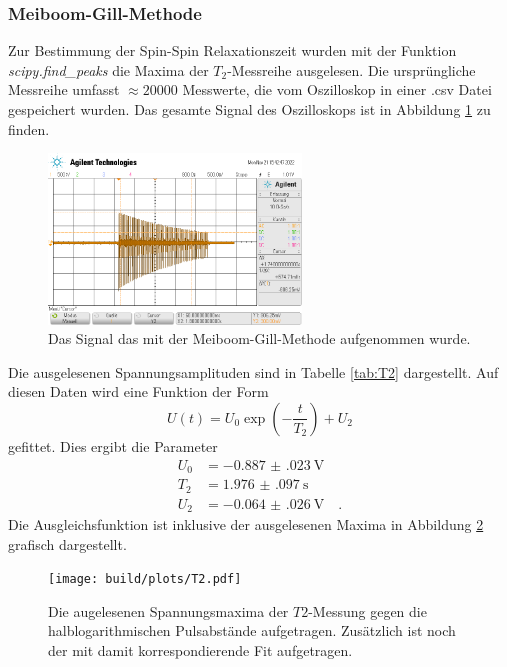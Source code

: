 \subsubsection{Meiboom-Gill-Methode}

\noindent
Zur Bestimmung der Spin-Spin Relaxationszeit wurden mit der Funktion \textit{scipy.find\_peaks} die Maxima der $T_2$-Messreihe ausgelesen. 
Die ursprüngliche Messreihe umfasst $\approx 20000$ Messwerte, die vom Oszilloskop in einer .csv Datei gespeichert wurden. 
Das gesamte Signal des Oszilloskops ist in Abbildung \ref{img:Sig1} zu finden.
\begin{figure}[H]
  \centering
  \includegraphics[width=0.6\textwidth]{python/data/scope_2.png}
  \caption{Das Signal das mit der Meiboom-Gill-Methode aufgenommen wurde.}
\label{img:Sig1}
\end{figure}


\noindent
Die ausgelesenen Spannungsamplituden sind in Tabelle \ref{tab:T2} dargestellt. 
Auf diesen Daten wird eine Funktion der Form
\begin{equation*}
  U\left(t\right) = U_0 \exp{\left(-\frac{t}{T_2}\right)} + U_2
\end{equation*}
gefittet. Dies ergibt die Parameter
\begin{align*}
  U_0 &= \SI{-0.887(023)}{\volt}\\
  T_2 &= \SI{1.976(097)}{\second}\\
  U_2 &= \SI{-0.064(026)}{\volt} \quad .
\end{align*}
Die Ausgleichsfunktion ist inklusive der ausgelesenen Maxima in Abbildung \ref{img:T2} grafisch dargestellt.


\begin{figure}[H]
  \centering
  \texttt{[image: build/plots/T2.pdf]}
  \caption{Die augelesenen Spannungsmaxima der $T2$-Messung gegen die halblogarithmischen Pulsabstände aufgetragen. 
  Zusätzlich ist noch der mit damit korrespondierende Fit aufgetragen.}
\label{img:T2}
\end{figure}


